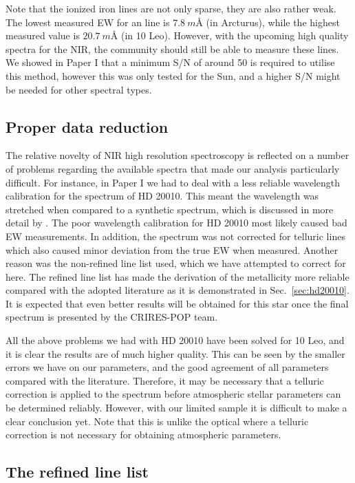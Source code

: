 \documentclass{aa}
\begin{document}
Note that the ionized iron lines are not only sparse, they are also rather weak.
The lowest measured EW for an  line is $\SI{7.8}{m}$\AA{} (in
Arcturus), while the highest measured value is $\SI{20.7}{m}$\AA{} (in 10 Leo).
However, with the upcoming high quality spectra for the NIR, the community
should still be able to measure these  lines. We showed in Paper I
that a minimum S/N of around 50 is required to utilise this method, however this
was only tested for the Sun, and a higher S/N might be needed for other spectral
types.


\subsection{Proper data reduction}

The relative novelty of NIR high resolution spectroscopy is reflected on a
number of problems regarding the available spectra that made our analysis
particularly difficult. For instance, in Paper I we had to deal with a less
reliable wavelength calibration for the spectrum of HD 20010. This meant the
wavelength was stretched when compared to a synthetic spectrum, which is
discussed in more detail by \citet{Nicholls2017}. The poor wavelength
calibration for HD 20010 most likely caused bad EW measurements. In addition,
the spectrum was not corrected for telluric lines which also caused minor
deviation from the true EW when measured. Another reason was the non-refined
line list used, which we have attempted to correct for here. The refined line
list has made the derivation of the metallicity more reliable compared with the
adopted literature as it is demonstrated in Sec.~\ref{sec:hd20010}. It is
expected that even better results will be obtained for this star once the final
spectrum is presented by the CRIRES-POP team.

All the above problems we had with HD 20010 have been solved for 10 Leo, and it
is clear the results are of much higher quality. This can be seen by the smaller
errors we have on our parameters, and the good agreement of all parameters
compared with the literature. Therefore, it may be necessary that a telluric
correction is applied to the spectrum before atmospheric stellar parameters can
be determined reliably. However, with our limited sample it is difficult to make
a clear conclusion yet. Note that this is unlike the optical where a telluric
correction is not necessary for obtaining atmospheric parameters.


\subsection{The refined line list}
\end{document}
